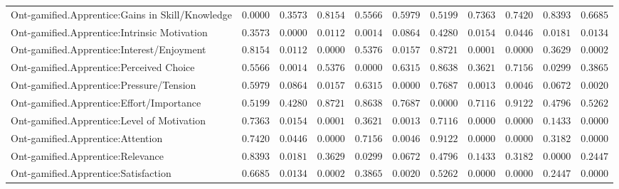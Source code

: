 \begin{landscape}
{\begin{longtable}{lrrrrrrrrrr}
Ont-gamified.Apprentice:Gains in Skill/Knowledge&$0.0000$&$0.3573$&$0.8154$&$0.5566$&$0.5979$&$0.5199$&$0.7363$&$0.7420$&$0.8393$&$0.6685$\tabularnewline
Ont-gamified.Apprentice:Intrinsic Motivation&$0.3573$&$0.0000$&$0.0112$&$0.0014$&$0.0864$&$0.4280$&$0.0154$&$0.0446$&$0.0181$&$0.0134$\tabularnewline
Ont-gamified.Apprentice:Interest/Enjoyment&$0.8154$&$0.0112$&$0.0000$&$0.5376$&$0.0157$&$0.8721$&$0.0001$&$0.0000$&$0.3629$&$0.0002$\tabularnewline
Ont-gamified.Apprentice:Perceived Choice&$0.5566$&$0.0014$&$0.5376$&$0.0000$&$0.6315$&$0.8638$&$0.3621$&$0.7156$&$0.0299$&$0.3865$\tabularnewline
Ont-gamified.Apprentice:Pressure/Tension&$0.5979$&$0.0864$&$0.0157$&$0.6315$&$0.0000$&$0.7687$&$0.0013$&$0.0046$&$0.0672$&$0.0020$\tabularnewline
Ont-gamified.Apprentice:Effort/Importance&$0.5199$&$0.4280$&$0.8721$&$0.8638$&$0.7687$&$0.0000$&$0.7116$&$0.9122$&$0.4796$&$0.5262$\tabularnewline
Ont-gamified.Apprentice:Level of Motivation&$0.7363$&$0.0154$&$0.0001$&$0.3621$&$0.0013$&$0.7116$&$0.0000$&$0.0000$&$0.1433$&$0.0000$\tabularnewline
Ont-gamified.Apprentice:Attention&$0.7420$&$0.0446$&$0.0000$&$0.7156$&$0.0046$&$0.9122$&$0.0000$&$0.0000$&$0.3182$&$0.0000$\tabularnewline
Ont-gamified.Apprentice:Relevance&$0.8393$&$0.0181$&$0.3629$&$0.0299$&$0.0672$&$0.4796$&$0.1433$&$0.3182$&$0.0000$&$0.2447$\tabularnewline
Ont-gamified.Apprentice:Satisfaction&$0.6685$&$0.0134$&$0.0002$&$0.3865$&$0.0020$&$0.5262$&$0.0000$&$0.0000$&$0.2447$&$0.0000$\tabularnewline
\hline

\end{longtable}}\end{landscape}




